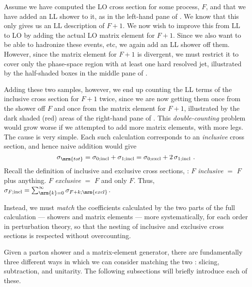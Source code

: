  Assume we have computed the LO cross section for some process, $F$,
 and that we have added an LL shower to it, as in the left-hand pane
 of . We know that this only gives us
 an LL description of $F+1$. We now wish to improve this from LL to LO  
 by adding the actual LO matrix element for $F+1$. Since we also want to
 be able to hadronize these events, etc, we again add an LL shower off
 them. However, since the matrix element for $F+1$ is divergent, we must
 restrict it to cover only the phase-space region with at least one
 hard resolved jet, illustrated by the half-shaded boxes in the middle
 pane of . 

%
%
%
%
Adding these two samples,
 however, we end up counting the LL terms of the inclusive cross
 section for $F+1$ twice, since we are now getting them once from the shower
 off $F$ and once from the matrix element for $F+1$, illustrated by
 the dark shaded (red) areas of the right-hand pane of
 . This \emph{double-counting} problem
 would grow worse if we attempted to add more matrix elements, with
 more legs. The cause is very simple. Each such calculation
 corresponds to an \emph{inclusive} cross section, and hence naive
 addition would give
\begin{equation}
\sigma_{\mrm{tot}} =\sigma_{0;\mathrm{incl}} +
  \sigma_{1;\mathrm{incl}} =  \sigma_{0;\mathrm{excl}} +  2\,\sigma_{1;\mathrm{incl}}~.
\end{equation}
Recall the definition of inclusive and exclusive cross
 sections, : $F$ \emph{inclusive} $=$ $F$ plus
  anything. $F$ \emph{exclusive} $=$ $F$ and only
  $F$. Thus, $\sigma_{F;\mathrm{incl}}=\sum_{\mrm{k}=
    0}^{\infty}\sigma_{F+k;\mrm{excl}}$.

 Instead, we must \emph{match} the coefficients calculated
 by the two parts of the full calculation --- showers and matrix
 elements --- more systematically, for each order in perturbation
 theory, so that the nesting of inclusive and exclusive cross sections
 is respected without overcounting.

Given a parton shower and a matrix-element generator, there are
fundamentally three different ways in which we can consider matching
the two \cite{Giele:2011cb}: slicing, subtraction, and unitarity. The
following subsections will briefly introduce each of these.

%
%
%
